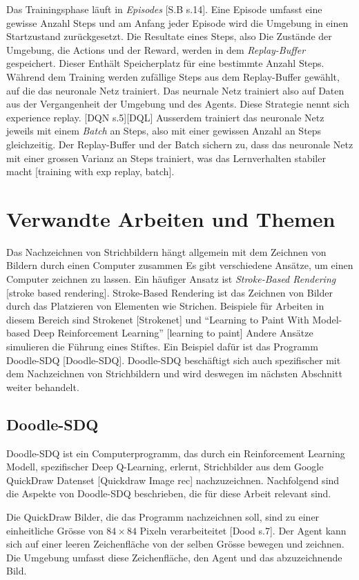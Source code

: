 Das Trainingsphase läuft in \emph{Episodes} [S.B s.14]. Eine Episode umfasst
eine gewisse Anzahl Steps und am Anfang jeder Episode wird die Umgebung in einen
Startzustand zurückgesetzt. Die Resultate eines Steps, also Die Zustände der
Umgebung, die Actions und der Reward, werden in dem \emph{Replay-Buffer}
gespeichert. Dieser Enthält Speicherplatz für eine bestimmte Anzahl Steps.
Während dem Training werden zufällige Steps aus dem Replay-Buffer gewählt, auf
die das neuronale Netz trainiert. Das neurnale Netz trainiert also auf Daten aus
der Vergangenheit der Umgebung und des Agents. Diese Strategie nennt sich
experience replay. [DQN s.5][DQL] Ausserdem trainiert das neuronale Netz jeweils mit
einem \emph{Batch} an Steps, also mit einer gewissen Anzahl an Steps
gleichzeitig. Der Replay-Buffer und der Batch sichern zu, dass das neuronale
Netz mit einer grossen Varianz an Steps trainiert, was das Lernverhalten
stabiler macht [training with exp replay, batch].


\section{Verwandte Arbeiten und Themen}
\label{chap:t_verwandt}
Das Nachzeichnen von Strichbildern hängt allgemein mit dem Zeichnen von Bildern
durch einen Computer zusammen Es gibt verschiedene Ansätze, um einen Computer
zeichnen zu lassen. Ein häufiger Ansatz ist \emph{Stroke-Based Rendering}
[stroke based rendering]. Stroke-Based Rendering ist das Zeichnen von Bilder
durch das Platzieren von Elementen wie Strichen. Beispiele für Arbeiten in
diesem Bereich sind Strokenet [Strokenet] und ``Learning to Paint With
Model-based Deep Reinforcement Learning'' [learning to paint] Andere Ansätze
simulieren die Führung eines Stiftes. Ein Beispiel dafür ist das Programm
Doodle-SDQ [Doodle-SDQ]. Doodle-SDQ beschäftigt sich auch spezifischer mit dem
Nachzeichnen von Strichbildern und wird deswegen im nächsten Abschnitt weiter
behandelt.

\subsection{Doodle-SDQ}
Doodle-SDQ ist ein Computerprogramm, das durch ein Reinforcement Learning
Modell, spezifischer Deep Q-Learning, erlernt, Strichbilder aus dem Google
QuickDraw Datenset [Quickdraw Image rec] nachzuzeichnen. Nachfolgend sind die Aspekte von Doodle-SDQ
beschrieben, die für diese Arbeit relevant sind.

Die QuickDraw Bilder, die das Programm nachzeichnen soll, sind zu einer
einheitliche Grösse von $84\times84$ Pixeln verarbeiteitet [Dood s.7]. Der Agent kann sich
auf einer leeren Zeichenfläche von der selben Grösse bewegen und zeichnen. Die
Umgebung umfasst diese Zeichenfläche, den Agent und das abzuzeichnende Bild.

